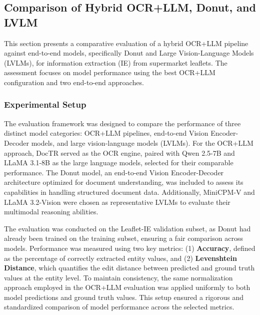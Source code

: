\documentclass[11pt]{article}
\begin{document}
\subsection{Comparison of Hybrid OCR+LLM, Donut, and LVLM}

This section presents a comparative evaluation of a hybrid OCR+LLM pipeline against end-to-end models, specifically Donut and Large Vision-Language Models (LVLMs), for information extraction (IE) from supermarket leaflets. The assessment focuses on model performance using the best OCR+LLM configuration and two end-to-end approaches.

\subsubsection{Experimental Setup}

The evaluation framework was designed to compare the performance of three distinct model categories: OCR+LLM pipelines, end-to-end Vision Encoder-Decoder models, and large vision-language models (LVLMs). For the OCR+LLM approach, DocTR served as the OCR engine, paired with Qwen 2.5-7B and LLaMA 3.1-8B as the large language models, selected for their comparable performance. The Donut model, an end-to-end Vision Encoder-Decoder architecture optimized for document understanding, was included to assess its capabilities in handling structured document data. Additionally, MiniCPM-V \cite{yao2024} and LLaMA 3.2-Vision \cite{touvron2023} were chosen as representative LVLMs to evaluate their multimodal reasoning abilities.

The evaluation was conducted on the Leaflet-IE validation subset, as Donut had already been trained on the training subset, ensuring a fair comparison across models. Performance was measured using two key metrics: (1) \textbf{Accuracy}, defined as the percentage of correctly extracted entity values, and (2) \textbf{Levenshtein Distance}, which quantifies the edit distance between predicted and ground truth values at the entity level. To maintain consistency, the same normalization approach employed in the OCR+LLM evaluation was applied uniformly to both model predictions and ground truth values. This setup ensured a rigorous and standardized comparison of model performance across the selected metrics.
\end{document}
